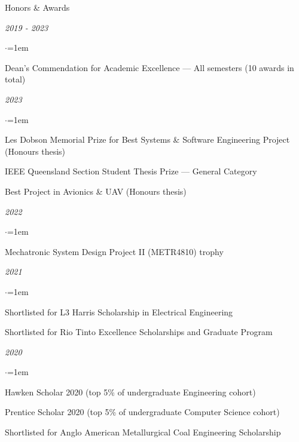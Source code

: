 \documentclass{resume} %
\begin{document}
\begin{rSection}{Honors \& Awards} \itemsep -2pt

    \item \textit{2019 - 2023}
    \begin{list}{$\cdot$}{\leftmargin=1em} %
        \item Dean's Commendation for Academic Excellence --- All semesters (10 awards in total)
    \end{list}

    \vspace{1em}

    \item \textit{2023}
    \begin{list}{$\cdot$}{\leftmargin=1em}
        \item Les Dobson Memorial Prize for Best Systems \& Software Engineering Project (Honours thesis)
        \item IEEE Queensland Section Student Thesis Prize --- General Category
        \item Best Project in Avionics \& UAV (Honours thesis)
    \end{list}

    \vspace{1em}

    \item \textit{2022}
    \begin{list}{$\cdot$}{\leftmargin=1em}
        \item Mechatronic System Design Project II (METR4810) trophy
    \end{list}

    \vspace{1em}

    \item \textit{2021}
    \begin{list}{$\cdot$}{\leftmargin=1em}
        \item Shortlisted for L3 Harris Scholarship in Electrical Engineering
        \item Shortlisted for Rio Tinto Excellence Scholarships and Graduate Program
    \end{list}

    \vspace{1em}

    \item \textit{2020}
    \begin{list}{$\cdot$}{\leftmargin=1em}
        \item Hawken Scholar 2020 (top 5\% of undergraduate Engineering cohort)
        \item Prentice Scholar 2020 (top 5\% of undergraduate Computer Science cohort)
        \item Shortlisted for Anglo American Metallurgical Coal Engineering Scholarship
    \end{list}


\end{rSection}
\end{document}
